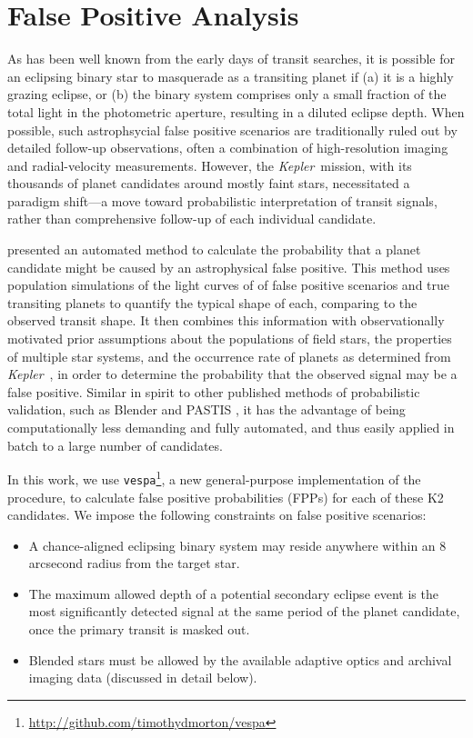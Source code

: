 \documentclass{emulateapj}
\newcommand{\project}[1]{\textsl{#1}}
\newcommand{\kep}{\project{Kepler}}
\begin{document}
\section{False Positive Analysis}
As has been well known from the early days of transit searches, it is
possible for an eclipsing binary star to masquerade as a transiting
planet if (a) it is a highly grazing eclipse, or (b) the binary system
comprises only a small fraction of the total light in the photometric
aperture, resulting in a diluted eclipse depth.
When possible, such astrophsycial false positive scenarios are traditionally
ruled out by detailed follow-up observations, often a combination of 
high-resolution imaging and radial-velocity measurements.
However, the \kep\ mission, with its thousands of planet candidates
around mostly faint stars, necessitated a paradigm shift---a move
toward probabilistic interpretation of transit signals, rather than
comprehensive follow-up of each individual candidate.

\citet{Morton12} presented an automated method to calculate the
probability that a planet candidate might be caused by an
astrophysical false positive.
This method uses population simulations of the light curves of
of false positive scenarios and true transiting planets to quantify
the typical shape of each, comparing to the observed transit shape.
It then combines this information with observationally motivated prior
assumptions about the populations of field stars, the properties of
multiple star systems, and the occurrence rate of planets as determined
from \kep\ \citep{Fressin13}, in order to determine the probability that
the observed signal may be a false positive.
Similar in spirit to other published methods of
probabilistic validation, such as Blender \citep{} and PASTIS
\citep{}, it has the advantage of being computationally less demanding
and fully automated, and thus easily applied in batch to a large
number of candidates.

In this work, we use
\texttt{vespa}\footnote{\url{http://github.com/timothydmorton/vespa}},
a new general-purpose implementation of the \citet{Morton12} procedure, 
to calculate false positive probabilities (FPPs) for each of these 
K2 candidates.  We impose the following constraints on false positive
scenarios:
\begin{itemize}
\item A chance-aligned eclipsing binary system may reside anywhere within
an 8 arcsecond radius from the target star.
\item The maximum allowed depth of a potential secondary eclipse event
is the most significantly detected signal at the same
period of the planet candidate, once the primary transit is masked out.
\item Blended stars must be allowed by the available adaptive optics
and archival imaging data (discussed in detail below).
\end{itemize}
\end{document}
